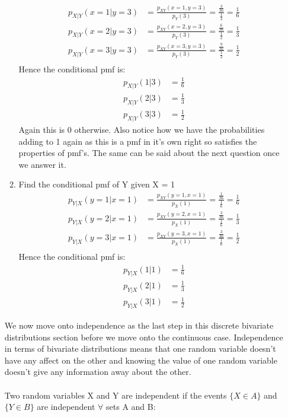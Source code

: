 \documentclass[,oneside]{article}
\begin{document}
\begin{enumerate}
\begin{enumerate}
\begin{align*}
p_{X|Y}(x=1|y=3)&=\frac{p_{XY}(x=1,y=3)}{p_Y(3)}=\frac{\frac{3}{36}}{\frac{1}{2}}=\frac{1}{6}\\
p_{X|Y}(x=2|y=3)&=\frac{p_{XY}(x=2,y=3)}{p_Y(3)}=\frac{\frac{6}{36}}{\frac{1}{2}}=\frac{1}{3}\\
p_{X|Y}(x=3|y=3)&=\frac{p_{XY}(x=3,y=3)}{p_Y(3)}=\frac{\frac{9}{36}}{\frac{1}{2}}=\frac{1}{2}\\
\end{align*}
Hence the conditional pmf is:
\begin{align*}
p_{X|Y}(1|3)&=\frac{1}{6}\\
p_{X|Y}(2|3)&=\frac{1}{3}\\
p_{X|Y}(3|3)&=\frac{1}{2}
\end{align*}
Again this is 0 otherwise. Also notice how we have the probabilities adding to 1 again as this is a pmf in it's own right so satisfies the properties of pmf's. The same can be said about the next question once we answer it.\\
\item Find the conditional pmf of Y given X = 1
\begin{align*}
p_{Y|X}(y=1|x=1)&=\frac{p_{XY}(y=1,x=1)}{p_X(1)}=\frac{\frac{1}{36}}{\frac{1}{6}}=\frac{1}{6}\\
p_{Y|X}(y=2|x=1)&=\frac{p_{XY}(y=2,x=1)}{p_X(1)}=\frac{\frac{2}{36}}{\frac{1}{6}}=\frac{1}{3}\\
p_{Y|X}(y=3|x=1)&=\frac{p_{XY}(y=3,x=1)}{p_X(1)}=\frac{\frac{3}{36}}{\frac{1}{6}}=\frac{1}{2}\\
\end{align*}
Hence the conditional pmf is:
\begin{align*}
p_{Y|X}(1|1)&=\frac{1}{6}\\
p_{Y|X}(2|1)&=\frac{1}{3}\\
p_{Y|X}(3|1)&=\frac{1}{2}
\end{align*}
\end{enumerate}
We now move onto independence as the last step in this discrete bivariate distributions section before we move onto the continuous case. Independence in terms of bivariate distributions means that one random variable doesn't have any affect on the other and knowing the value of one random variable doesn't give any information away about the other.\\ \\
Two random variables X and Y are independent if the events $\{ X \in A\}$ and $\{ Y \in B \}$ are independent $\forall$ sets A and B:

\end{enumerate}
\end{document}
